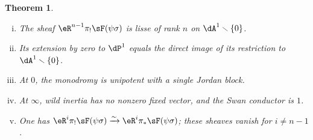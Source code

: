 \documentclass[12pt,oneside,english]{smfbook}
\newcommand{\iso}{\xrightarrow\sim}
\renewcommand{\setminus}{\smallsetminus}
\newtheorem{theorem_}[subsection]{Theorem}
\begin{document}
\begin{theorem_}\label{VI:7-8}
\begin{enumerate}[(i)]
  \item The sheaf $\eR^{n-1}\pi_!\sF(\psi\sigma)$ is lisse of rank $n$ on $\dA^1\setminus\{0\}$.
  \item Its extension by zero to $\dP^1$ equals the direct image of its restriction to $\dA^1\setminus\{0\}$.
  \item At $0$, the monodromy is unipotent with a single Jordan block.
  \item At $\infty$, wild inertia has no nonzero fixed vector, and the Swan conductor is $1$.
  \item One has $\eR^i\pi_!\sF(\psi\sigma)\iso\eR^i\pi_\ast\sF(\psi\sigma)$; these sheaves vanish for $i\ne n-1$.
\end{enumerate}
\end{theorem_}
\end{document}
